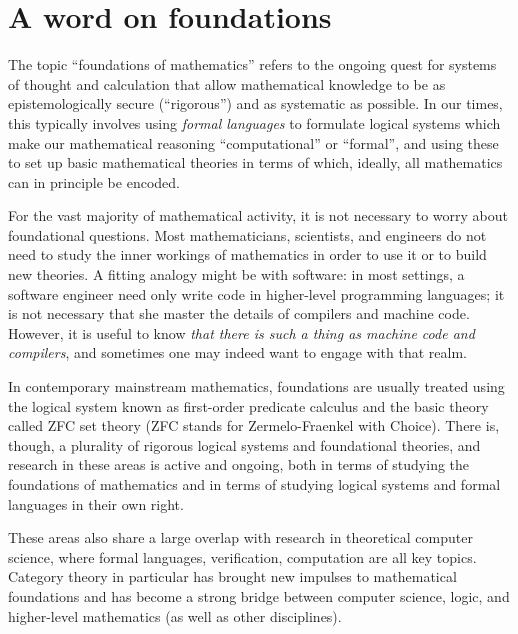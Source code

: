 
\section{A word on foundations}\label{sec:foundations}


The topic ``foundations of mathematics'' refers to the ongoing quest for systems of thought and calculation that allow mathematical knowledge to be as epistemologically secure (``rigorous'') and as systematic as possible.
In our times, this typically involves using \emph{formal languages} to formulate logical systems which make our mathematical reasoning ``computational'' or ``formal'', and using these to set up basic mathematical theories in terms of which, ideally, all mathematics can in principle be encoded.

For the vast majority of mathematical activity, it is not necessary to worry about foundational questions.
Most mathematicians, scientists, and engineers do not need to study the inner workings of mathematics in order to use it or to build new theories.
A fitting analogy might be with software: in most settings, a software engineer need only write code in higher-level programming languages; it is not necessary that she master the details of compilers and machine code.
However, it is useful to know \emph{that there is such a thing as machine code and compilers}, and sometimes one may indeed want to engage with that realm.

In contemporary mainstream mathematics, foundations are usually treated using the logical system known as first-order predicate calculus and the basic theory called ZFC set theory (ZFC stands for Zermelo-Fraenkel with Choice).
There is, though, a plurality of rigorous logical systems and foundational theories, and research in these areas is active and ongoing, both in terms of studying the foundations of mathematics and in terms of studying logical systems and formal languages in their own right.

These areas also share a large overlap with research in theoretical computer science, where formal languages, verification, computation \etc are all key topics.
Category theory in particular has brought new impulses to mathematical foundations and has become a strong bridge between computer science, logic, and higher-level mathematics (as well as other disciplines).

